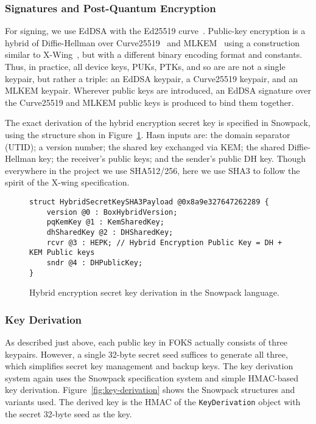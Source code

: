 \subsubsection{Signatures and Post-Quantum Encryption}

For signing, we use EdDSA with the Ed25519 curve~\cite{eddsa}.  Public-key
encryption is a hybrid of Diffie-Hellman over
Curve25519~\cite{cryptoeprint:2011:141} and MLKEM~\cite{nist-fips-203} using a
construction similar to X-Wing~\cite{xwing}, but with a different binary
encoding format and constants. Thus, in practice, all device keys, PUKs,
PTKs, and so are are not a single keypair, but rather a triple: an EdDSA 
keypair, a Curve25519 keypair, and an MLKEM keypair. Wherever public keys
are introduced, an EdDSA signature over the Curve25519 and MLKEM public keys
is produced to bind them together.

The exact derivation of the hybrid encryption secret key is specified in 
Snowpack, using the structure shon in Figure~\ref{fig:xwing}. Hasn inputs are:
the domain separator (UTID); a version number; the shared key exchanged via KEM;
the shared Diffie-Hellman key; the receiver's public keys; and the sender's
public DH key. Though everywhere in the project we use SHA512/256, here we 
use SHA3 to follow the spirit of the X-wing specification.

\begin{figure}[ht]
  \centering
  \begin{verbatim}
struct HybridSecretKeySHA3Payload @0x8a9e327647262289 {
    version @0 : BoxHybridVersion;
    pqKemKey @1 : KemSharedKey;
    dhSharedKey @2 : DHSharedKey; 
    rcvr @3 : HEPK; // Hybrid Encryption Public Key = DH + KEM Public keys
    sndr @4 : DHPublicKey;
}
  \end{verbatim}
  \caption{Hybrid encryption secret key derivation in the Snowpack language.}
  \label{fig:xwing}
\end{figure}

\subsubsection{Key Derivation}
\label{sec:xwing-key-derivation}

As described just above, each public key in FOKS actually consists of three keypairs. However,
a single 32-byte secret seed suffices to generate all three, which simplifies secret key
management and backup keys.  The key derivation system again uses the Snowpack specification
system and simple HMAC-based key derivation. Figure~\ref{fig:key-derivation} shows the 
Snowpack structures and variants used. The derived key is the HMAC of the \texttt{KeyDerivation} object
with the secret 32-byte seed as the key.

